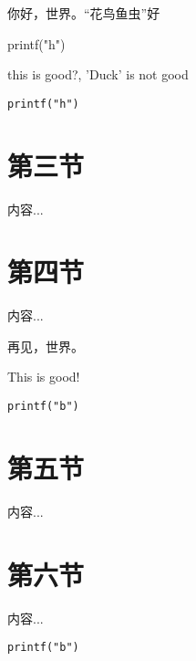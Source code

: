 \documentclass[a4paper,12pt]{article}
\begin{document}
你好，世界。“花鸟鱼虫”好

printf("h")

this is good?, 'Duck' is not good

\verb|printf("h")|

\newpage

\section{第三节}
内容...

\section{第四节}
内容...

再见，世界。

This is good!

\verb|printf("b")|

\newpage

\section{第五节}
内容...

\section{第六节}
内容...

\verb|printf("b")|

\label{LastPage}
\end{document}
